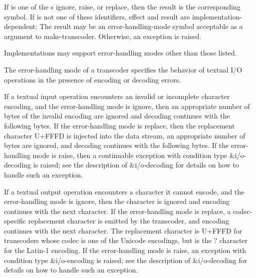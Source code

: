 \begin{entry}{%
}

If  is one of the s {\cf ignore}, {\cf
  raise}, or {\cf replace}, then the result is the corresponding
symbol.  If  is not one of these identifiers, effect and
result are implementation-dependent: The result may be an
error-handling-mode symbol acceptable as a 
argument to {\cf make-transcoder}.  Otherwise, an exception is raised.

\begin{rationale}
  Implementations may support error-handling modes other than those
  listed.
\end{rationale}

The error-handling mode of a transcoder specifies the behavior
of textual I/O operations in the presence of encoding or decoding
errors.

If a textual input operation encounters an invalid or incomplete
character encoding, and the error-handling mode is {\cf ignore},
then an appropriate number of bytes of the
invalid encoding are ignored and decoding continues with the
following bytes.
If the error-handling mode is {\cf replace}, then the replacement
character U+FFFD is injected into the data stream, an appropriate
number of bytes are ignored, and decoding
continues with the following bytes.
If the error-handling mode is {\cf raise}, then a continuable
exception with condition type {\cf\&i/o-decoding} is raised;
see the description of
{\cf\&i/o-decoding} for details
on how to handle such an exception.

If a textual output operation encounters a character it cannot encode,
and the error-handling mode is {\cf ignore}, then the character is
ignored and encoding continues with the next character.
If the error-handling mode is {\cf replace}, a codec-specific
replacement character is emitted by the transcoder, and encoding
continues with the next character.
The replacement character is U+FFFD for transcoders whose codec
is one of the Unicode encodings, but is the {\cf ?}
character for the Latin-1 encoding.
If the error-handling mode is {\cf raise}, an
exception with condition type {\cf\&i/o-encoding} is raised;
see the description of
{\cf\&i/o-decoding} for details
on how to handle such an exception.
\end{entry}

